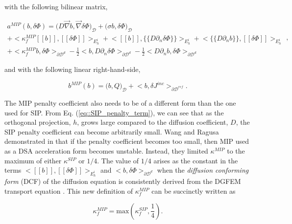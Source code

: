 \noindent with the following bilinear matrix,

\begin{equation}
\label{eq::MIP_bilinear_form}
\begin{aligned}
a^{MIP}(b, \delta \Phi)  = \Big(  D \vec{\nabla} b , \vec{\nabla} \delta \Phi  \Big)_{\mathcal{D}} + \Big(  \sigma b , \delta \Phi  \Big)_{\mathcal{D}}    \\
+  \Big< \kappa_f^{MIP} [\![   b ]\!] , [\![  \delta \Phi ]\!]\Big>_{E_h^i} + \Big<  [\![  b ]\!] , \{\!\{  D \partial_n \delta \Phi \}\!\}\Big>_{E_h^i}  + \Big< \{\!\{  D \partial_n b \}\!\} , [\![ \delta \Phi ]\!]\Big>_{E_h^i} \\
+ \Big< \kappa_f^{MIP}  b , \delta  \Phi \Big>_{\partial \mathcal{D}^d} - \frac{1}{2} \Big<  b ,  D \partial_n \delta \Phi \Big>_{\partial \mathcal{D}^d} - \frac{1}{2} \Big<   D \partial_n b , \delta \Phi \Big>_{\partial \mathcal{D}^d}  
\end{aligned} ,
\end{equation}

\noindent and with the following linear right-hand-side,

\begin{equation}
\label{eq::MIP_linear_form}
b^{MIP} (b) = \Big(  b, Q  \Big)_{\mathcal{D}}  + \Big< b, \delta  J^{inc}  \Big>_{\partial \mathcal{D}^{ref}} .
\end{equation}

\noindent The MIP penalty coefficient also needs to be of a different form than the one used for SIP. From Eq. (\ref{eq::SIP_penalty_term}), we can see that as the orthogonal projection, $h$, grows large compared to the diffusion coefficient, $D$, the SIP penalty coefficient can become arbitrarily small. Wang and Ragusa demonstrated in \cite{ragusa2010two} that if the penalty coefficient becomes too small, then MIP used as a DSA acceleration form becomes unstable. Instead, they limited $\kappa^{MIP}$ to the maximum of either $\kappa^{SIP}$ or $1/4$. The value of $1/4$ arises as the constant in the terms $\Big<  [\![   b ]\!] , [\![  \delta \Phi ]\!]\Big>_{E_h^i} $ and $\Big<  b , \delta  \Phi \Big>_{\partial \mathcal{D}^d}$ when the {\em diffusion conforming form} (DCF) of the diffusion equation is consistently derived from the DGFEM transport equation \cite{ref::DSA_wang_ragusa}. This new definition of $\kappa_f^{MIP}$ can be succinctly written as

\begin{equation}
\label{eq::MIP_penalty_term}
\kappa_f^{MIP} = \text{max} \left( \kappa_f^{SIP}, \frac{1}{4} \right).
\end{equation}

